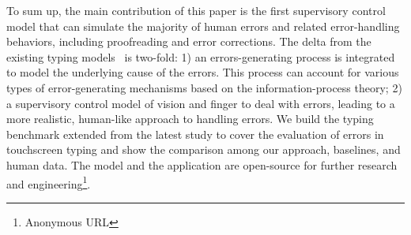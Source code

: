 To sum up, the main contribution of this paper is the first supervisory control model that can simulate the majority of human errors and related error-handling behaviors, including proofreading and error corrections. 
The delta from the existing typing models~\cite{jokinen2021touchscreen, shi2024crtypist} is two-fold: 1) an errors-generating process is integrated to model the underlying cause of the errors. This process can account for various types of error-generating mechanisms based on the information-process theory; 2) a supervisory control model of vision and finger to deal with errors, leading to a more realistic, human-like approach to handling errors.
We build the typing benchmark extended from the latest study to cover the evaluation of errors in touchscreen typing and show the comparison among our approach, baselines, and human data.
The model and the application are open-source for further research and engineering\footnote{Anonymous URL}.